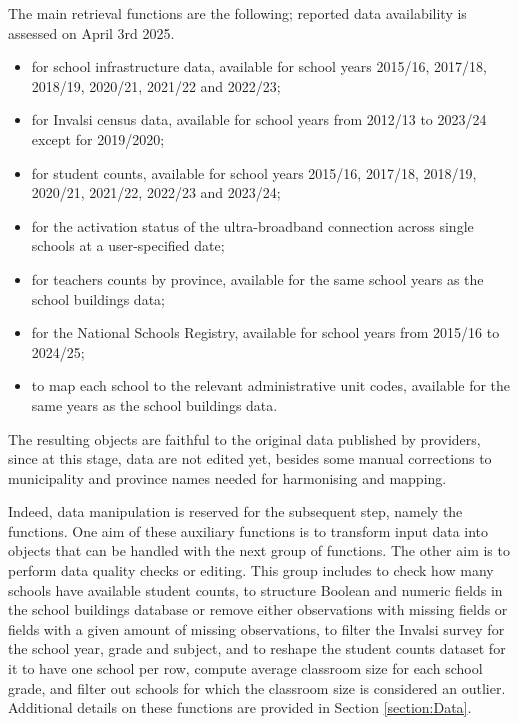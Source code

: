 \documentclass[openany, 11pt, oneside]{book}
\begin{document}
The main retrieval functions are the following; reported data availability is assessed on April 3rd 2025.
\begin{itemize}
    \item \texttt{} for school infrastructure data, available for school years 2015/16, 2017/18, 2018/19, 2020/21, 2021/22 and 2022/23;
    \item \texttt{} for Invalsi census data, available for school years from 2012/13 to 2023/24 except for 2019/2020; 
    \item \texttt{} for student counts, available for school years 2015/16, 2017/18, 2018/19, 2020/21, 2021/22, 2022/23 and 2023/24;
    \item \texttt{} for the activation status of the ultra-broadband connection across single schools at a user-specified date;
    \item \texttt{} for teachers counts by province, available for the same school years as the school buildings data;
    \item \texttt{} for the National Schools Registry, available for school years from 2015/16 to 2024/25;
    \item \texttt{} to map each school to the relevant administrative unit codes, available for the same years as the school buildings data.
\end{itemize}
The resulting objects are faithful to the original data published by providers, since at this stage, data are not edited yet, besides some manual corrections to municipality and province names needed for harmonising and mapping. 

Indeed, data manipulation is reserved for the subsequent step, namely the \texttt{} functions. One aim of these auxiliary functions is to transform input data into objects that can be handled with the next group of functions. The other aim is to perform data quality checks or editing. This group includes \texttt{} to check how many schools have available student counts, \texttt{} to structure Boolean and numeric fields in the school buildings database or remove either observations with missing fields or fields with a given amount of missing observations, \texttt{} to filter the Invalsi survey for the school year, grade and subject, and \texttt{} to reshape the student counts dataset for it to have one school per row, compute average classroom size for each school grade, and filter out schools for which the classroom size is considered an outlier. Additional details on these functions are provided in Section \ref{section:Data}. 
\end{document}
